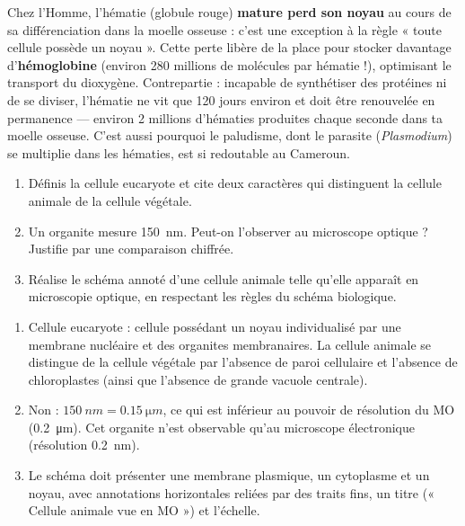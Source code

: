 \documentclass[11pt]{article}
\begin{document}
\begin{savaistu}
Chez l'Homme, l'hématie (globule rouge) \textbf{mature perd son noyau} au cours de sa différenciation dans la moelle osseuse : c'est une exception à la règle « toute cellule possède un noyau ». Cette perte libère de la place pour stocker davantage d'\textbf{hémoglobine} (environ 280 millions de molécules par hématie !), optimisant le transport du dioxygène. Contrepartie : incapable de synthétiser des protéines ni de se diviser, l'hématie ne vit que 120 jours environ et doit être renouvelée en permanence — environ 2 millions d'hématies produites chaque seconde dans ta moelle osseuse. C'est aussi pourquoi le paludisme, dont le parasite (\emph{Plasmodium}) se multiplie dans les hématies, est si redoutable au Cameroun.
\end{savaistu}

\begin{exercice}
\begin{enumerate}
\item Définis la cellule eucaryote et cite deux caractères qui distinguent la cellule animale de la cellule végétale.
\item Un organite mesure \SI{150}{nm}. Peut-on l'observer au microscope optique ? Justifie par une comparaison chiffrée.
\item Réalise le schéma annoté d'une cellule animale telle qu'elle apparaît en microscopie optique, en respectant les règles du schéma biologique.
\end{enumerate}
\end{exercice}

\begin{corrige}[Exercice]
\begin{enumerate}
\item Cellule eucaryote : cellule possédant un noyau individualisé par une membrane nucléaire et des organites membranaires. La cellule animale se distingue de la cellule végétale par l'absence de paroi cellulaire et l'absence de chloroplastes (ainsi que l'absence de grande vacuole centrale).
\item Non : $\SI{150}{nm} = \SI{0,15}{\micro m}$, ce qui est inférieur au pouvoir de résolution du MO (\SI{0,2}{\micro m}). Cet organite n'est observable qu'au microscope électronique (résolution \SI{0,2}{nm}).
\item Le schéma doit présenter une membrane plasmique, un cytoplasme et un noyau, avec annotations horizontales reliées par des traits fins, un titre (« Cellule animale vue en MO ») et l'échelle.
\end{enumerate}
\end{corrige}
\end{document}
